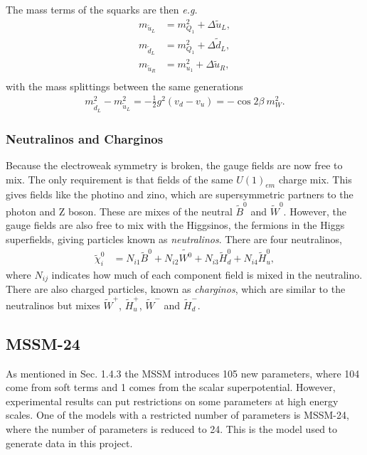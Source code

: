 \documentclass[twoside,english]{uiofysmaster}
\begin{document}
The mass terms of the squarks are then \textit{e.g.}
\begin{align}
m_{\tilde{u}_L} &= m_{Q_1}^2 + \Delta \tilde{u}_L,\\
m_{\tilde{d}_L} &= m_{Q_1}^2 + \Delta \tilde{d}_L,\\
m_{\tilde{u}_R} &= m_{u_1}^2 + \Delta \tilde{u}_R,\\
\end{align}
with the mass splittings between the same generations
\begin{align}
m_{\tilde{d}_L}^2 - m_{\tilde{u}_L}^2 = - \frac{1}{2} g^2(v_d - v_u) = - \cos 2 \beta ~ m_W^2.
\end{align}


\subsubsection{Neutralinos and Charginos}

Because the electroweak symmetry is broken, the gauge fields are now free to mix. The only requirement is that fields of the same $U(1)_{em}$ charge mix. This gives  fields like the photino and zino, which are supersymmetric partners to the photon and Z boson. These are mixes of the neutral $\tilde{B}^0$ and $\tilde{W}^0$. However, the gauge fields are also free to mix with the Higgsinos, the fermions in the Higgs superfields, giving particles known as \textit{neutralinos}. There are four neutralinos,
\begin{align}
\tilde{\chi}_i^0 &= N_{i1} \tilde{B}^0 + N_{i2} \tilde{W^0} + N_{i3} \tilde{H}_d^0 + N_{i4} \tilde{H}_u^0,
\end{align}
where $N_{ij}$ indicates how much of each component field is mixed in the neutralino. There are also charged particles, known as \textit{charginos}, which are similar to the neutralinos but mixes $\tilde{W}^+$, $\tilde{H}_u^+$, $\tilde{W}^-$ and $\tilde{H}_d^-$.

\subsection{MSSM-24}

As mentioned in Sec. 1.4.3 the MSSM introduces 105 new parameters, where 104 come from soft terms and 1 comes from the scalar superpotential. However, experimental results can put restrictions on some parameters at high energy scales. One of the models with a restricted number of parameters is MSSM-24, where the number of parameters is reduced to 24. This is the model used to generate data in this project. 
\end{document}
